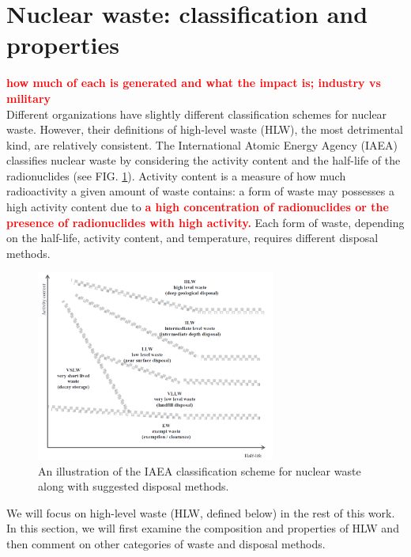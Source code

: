 \documentclass[preprint,aip,pra]{revtex4-1}
\newcommand{\red}[1]{\textcolor{red}{\bf #1}}
\begin{document}
\section{Nuclear waste: classification and properties}
    \red{how much of each is generated and what the impact is; industry vs military}\\
    Different organizations have slightly different classification schemes for nuclear waste.
    However, their definitions of high-level waste (HLW), the most detrimental kind, are relatively consistent.
    The International Atomic Energy Agency (IAEA) classifies nuclear waste by considering the activity
    content and the half-life of the radionuclides (see FIG. \ref{fig:scheme}).
    Activity content is a measure of how much radioactivity
    a given amount of waste contains: a form of waste may possesses a high activity content due to
    \red{a high concentration of radionuclides or the presence of radionuclides with high activity.}\cite{iaea09}
    Each form of waste, depending on the half-life, activity content, and temperature, requires different
    disposal methods.
    \begin{figure}[h]
        \centering
        \includegraphics[width=0.7\textwidth]{wastescheme.png}
        \caption{An illustration of the IAEA classification scheme for nuclear waste along with suggested
        disposal methods.\cite{iaea09}}
        \label{fig:scheme}
    \end{figure}
    We will focus on high-level waste (HLW, defined below) in the rest of this work.
    In this section, we will first examine the composition and properties of HLW and then
    comment on other categories of waste and disposal methods.
\end{document}
